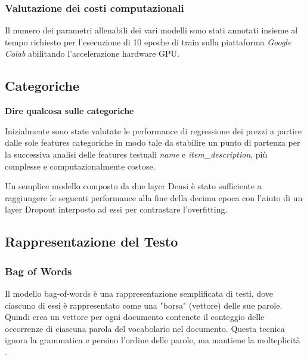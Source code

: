 
\subsubsection{Valutazione dei costi computazionali}

Il numero dei parametri allenabili dei vari modelli sono stati annotati insieme
al tempo richiesto per l'esecuzione di 10 epoche di train sulla piattaforma
\textit{Google Colab} abilitando l'accelerazione hardware GPU.

\subsection{Categoriche}
\textbf{Dire qualcosa sulle categoriche}

Inizialmente sono state valutate le performance di regressione dei prezzi a
partire dalle sole features categoriche in modo tale da stabilire un punto di
partenza per la successiva analisi delle features testuali \textit{name} e
\textit{item\_description}, più complesse e computazionalmente costose.

Un semplice modello composto da due layer Densi è stato sufficiente a
raggiungere le seguenti performance alla fine della decima epoca con l'aiuto di
un layer Dropout interposto ad essi per contrastare l'overfitting.



\subsection{Rappresentazione del Testo}

\subsubsection{Bag of Words}
Il modello bag-of-words è una rappresentazione semplificata  di testi, dove
ciascuno di essi è rappresentato come una "borsa" (vettore) delle sue parole.
Quindi crea un vettore per ogni documento contenete il conteggio delle
occorrenze di ciascuna parola del vocabolario nel documento. Questa tecnica
ignora la grammatica e persino l'ordine delle parole, ma mantiene la
molteplicità \cite{manning_raghavan_schutze_2008}.
